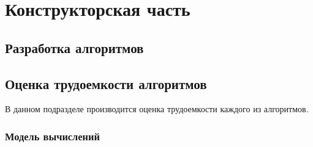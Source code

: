 \chapter{Конструкторская часть}


\section{Разработка алгоритмов}


\subsection{}


\section{Оценка трудоемкости алгоритмов}

В данном подразделе производится оценка трудоемкости каждого из алгоритмов.

\subsection{Модель вычислений}

